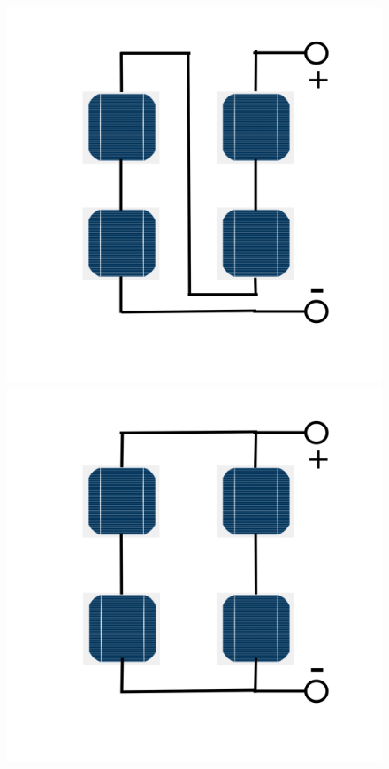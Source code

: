 \documentclass[a4paper]{article}
\begin{document}
\begin{figure}[H]
    \centering
    \includegraphics[scale=0.10]{Series(S)}
    \includegraphics[scale=0.10]{Series-parallel(SP)}

\end{figure}
\end{document}
